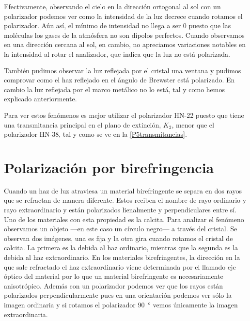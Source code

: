 \documentclass[12pt]{article}
\numberwithin{table}{section}
\numberwithin{figure}{section}
\numberwithin{equation}{section}
\begin{document}
Efectivamente, observando el cielo en la dirección ortogonal al sol con un polarizador podemos ver como la intensidad de la luz decrece cuando rotamos el polarizador. Aún así, el mínimo de intensidad no llega a ser 0 puesto que las moléculas los gases de la atmósfera no son dipolos perfectos. Cuando observamos en una dirección cercana al sol, en cambio, no apreciamos variaciones notables en la intensidad al rotar el analizador, que indica que la luz no está polarizada.  

También pudimos observar la luz reflejada por el cristal una ventana y pudimos comprovar como el haz reflejado en el ángulo de Brewster está polarizado. En cambio la luz reflejada por el marco metálico no lo está, tal y como hemos explicado anteriormente.

Para ver estos fenómenos es mejor utilizar el polarizador HN-22 puesto que tiene una transmitancia principal en el plano de extinción, \( K_2 \), menor que el polarizador HN-38, tal y como se ve en la \cref{P5transmitancias}.

\section{Polarización por birefringencia}
Cuando un haz de luz atraviesa un material birefringente se separa en dos rayos que se refractan de manera diferente. Estos reciben el nombre de rayo ordinario y rayo extraordinario y están polarizados lienalmente y perpendiculares entre sí. Uno de los materiales con esta propiedad es la calcita. Para analizar el fenómeno observamos un objeto ---en este caso un círculo negro--- a través del cristal. Se observan dos imágenes, una es fija y la otra gira cuando rotamos el cristal de calcita. La primera es la debida al haz ordinario, mientras que la segunda es la debida al haz extraordinario. En los materiales birefringentes, la dirección en la que sale refractado el haz extraordinario viene determinada por el llamado eje óptico del material por lo que un material birefringente es necesariamente anisotrópico. Además con un polarizador podemos ver que los rayos están polarizados perpendicularmente pues en una orientación podemos ver sólo la imagen ordinaria y si rotamos el polarizador \SI{90}{\degree} vemos únicamente la imagen extraordinaria. 
\end{document}

